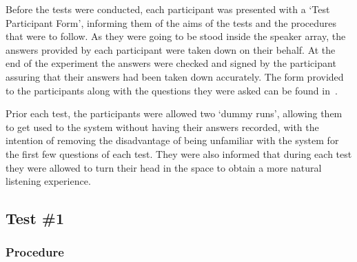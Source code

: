 \documentclass[../../main.tex]{subfiles}
\begin{document}
		

		 	\vspace{5mm}

			Before the tests were conducted, each participant was presented with a `Test Participant Form', informing them of the aims of the tests and the procedures that were to follow. As they were going to be stood inside the speaker array, the answers provided by each participant were taken down on their behalf. At the end of the experiment the answers were checked and signed by the participant assuring that their answers had been taken down accurately. The form provided to the participants along with the questions they were asked can be found in~.

			Prior each test, the participants were allowed two `dummy runs', allowing them to get used to the system without having their answers recorded, with the intention of removing the disadvantage of being unfamiliar with the system for the first few questions of each test. They were also informed that during each test they were allowed to turn their head in the space to obtain a more natural listening experience.


	\subsection{Test \#1}

		\subsubsection{Procedure}
\end{document}
